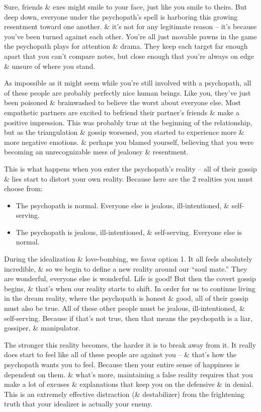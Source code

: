 \documentclass{article}
\numberwithin{equation}{section}
\begin{document}
Sure, friends \& exes might smile to your face, just like you smile to theirs. But deep down, everyone under the psychopath's spell is harboring this growing resentment toward one another. \& it's not for any legitimate reason -- it's because you've been turned against each other. You're all just movable pawns in the game the psychopath plays for attention \& drama. They keep each target far enough apart that you can't compare notes, but close enough that you're always on edge \& unsure of where you stand.

As impossible as it might seem while you're still involved with a psychopath, all of these people are probably perfectly nice human beings. Like you, they've just been poisoned \& brainwashed to believe the worst about everyone else. Most empathetic partners are excited to befriend their partner's friends \& make a positive impression. This was probably true at the beginning of the relationship, but as the triangulation \& gossip worsened, you started to experience more \& more negative emotions. \& perhaps you blamed yourself, believing that you were becoming an unrecognizable mess of jealousy \& resentment.

This is what happens when you enter the psychopath's reality -- all of their gossip \& lies start to distort your own reality. Because here are the 2 realities you must choose from:
\begin{itemize}
	\item The psychopath is normal. Everyone else is jealous, ill-intentioned, \& self-serving.
	\item The psychopath is jealous, ill-intentioned, \& self-serving. Everyone else is normal.
\end{itemize}
During the idealization \& love-bombing, we favor option 1. It all feels absolutely incredible, \& so we begin to define a new reality around our ``soul mate.'' They are wonderful, everyone else is wonderful. Life is good! But then the covert gossip begins, \& that's when our reality starts to shift. In order for us to continue living in the dream reality, where the psychopath is honest \& good, all of their gossip must also be true. All of these other people must be jealous, ill-intentioned, \& self-serving. Because if that's not true, then that means the psychopath is a liar, gossiper, \& manipulator.

The stronger this reality becomes, the harder it is to break away from it. It really does start to feel like all of these people are against you -- \& that's how the psychopath wants you to feel. Because then your entire sense of happiness is dependent on them. \& what's more, maintaining a false reality requires that you make a lot of excuses \& explanations that keep you on the defensive \& in denial. This is an extremely effective distraction (\& destabilizer) from the frightening truth that your idealizer is actually your enemy.
\end{document}
